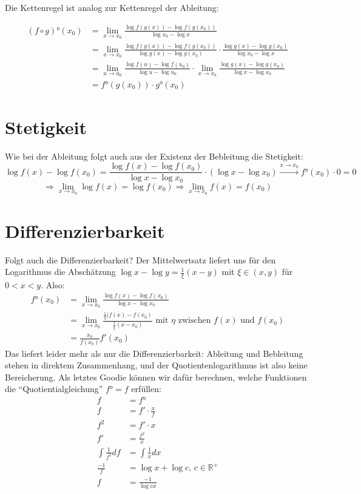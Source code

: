 \documentclass{amsart}
\begin{document}
Die Kettenregel ist analog zur Kettenregel der Ableitung:

\begin{align*}
(f\circ g)°(x_0) &= \lim_{x\to x_0} \frac{\log f(g(x)) - \log f(g(x_0))}{\log x_0 - \log x}\\
&= \lim_{x\to x_0} \frac{\log f(g(x)) - \log f(g(x_0))}{\log g(x) - \log g(x_0)}\cdot \frac{\log g(x) - \log g(x_0)}{\log x_0 - \log x}\\
&= \lim _{u \to u_0} \frac{\log f(u) - \log f(u_0)}{\log u - \log u_0} \cdot \lim_{x\to x_0} \frac{\log g(x) - \log g(x_0)}{\log x - \log x_0}\\
&= f°(g(x_0)) \cdot g°(x_0)
\end{align*}

\section{Stetigkeit}

Wie bei der Ableitung folgt auch aus der Existenz der Bebleitung die Stetigkeit:
\[ \log f(x)- \log f(x_0) = \frac{\log f(x) - \log f(x_0)}{\log x - \log x_0}\cdot(\log x - \log x_0) \stackrel{x\to x_0}{\to} f°(x_0) \cdot 0 = 0 \]
\[\Rightarrow \lim_{x\to x_0}\log f(x) = \log f(x_0) \Rightarrow \lim_{x\to x_0} f(x) =  f(x_0) \]


\section{Differenzierbarkeit}
Folgt auch die Differenzierbarkeit? Der Mittelwertsatz liefert uns für den Logarithmus die Abschätzung $\log x - \log y = \frac{1}{\xi}(x-y)$ mit $\xi \in (x,y)$ für $0<x<y$. Also:
\begin{align*}
f°(x_0) &= \lim_{x\to x_0} \frac{ \log f(x) - \log f(x_0)}{\log x - \log x_0} \\
&= \lim_{x\to x_0} \frac{ \frac1{\eta} (f(x) - f(x_0)}{\frac1{\xi} (x-x_0)} \text{ mit $\eta$ zwischen $f(x)$ und $f(x_0)$} \\
&= \frac{x_0}{f(x_0)} f'(x_0)
\end{align*}
Das liefert leider mehr als nur die Differenzierbarkeit: Ableitung und Bebleitung stehen in direktem Zusammenhang, und der Quotientenlogarithmus ist also keine Bereicherung. Als letztes Goodie können wir dafür berechnen, welche Funktionen die "`Quotientialgleichung"' $f°=f$ erfüllen:
\begin{align*}
f &= f° \\
f &= f'\cdot \frac{x}{f} \\
f^2 &= f'\cdot x\\
f' &= \frac{f^2}{x}\\
\int\frac{1}{f^2}df  &= \int\frac{1}xdx\\
\frac{-1}{f} &= \log x + \log c\text{, }c\in\mathbb{R}^+\\
f &= \frac{-1}{\log cx}
\end{align*}
\end{document}
